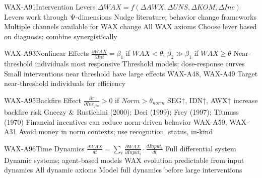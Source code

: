 \begin{axiomspec}{WAX-A91}{Intervention Levers}
 $\Delta WAX = f(\Delta AWX, \Delta UNS, \Delta KOM, \Delta Inc)$
 Levers work through Ψ-dimensions
 Nudge literature; behavior change frameworks
 Multiple channels available for WAX change
 All WAX axioms
 Choose lever based on diagnosis; combine synergistically
\end{axiomspec}

\begin{axiomspec}{WAX-A93}{Nonlinear Effects}
 $\frac{\partial WAX}{\partial Int} = \beta_1$ if $WAX < \theta$; $\beta_2 \gg \beta_1$ if $WAX \geq \theta$
 Near-threshold individuals most responsive
 Threshold models; dose-response curves
 Small interventions near threshold have large effects
 WAX-A48, WAX-A49
 Target near-threshold individuals for efficiency
\end{axiomspec}

\begin{axiomspec}{WAX-A95}{Backfire Effect}
 $\frac{\partial \tau}{\partial Inc_{fin}} > 0$ if $Norm > \theta_{norm}$
 SEG↑, IDN↑, AWX↑ increase backfire risk
 Gneezy \& Rustichini (2000); Deci (1999); Frey (1997); Titmuss (1970)
 Financial incentives can reduce norm-driven behavior
 WAX-A59, WAX-A31
 Avoid money in norm contexts; use recognition, status, in-kind
\end{axiomspec}


\begin{axiomspec}{WAX-A96}{Time Dynamics}
 $\frac{dWAX}{dt} = \sum_i \frac{\partial WAX}{\partial Input_i} \cdot \frac{dInput_i}{dt}$
 Full differential system
 Dynamic systems; agent-based models
 WAX evolution predictable from input dynamics
 All dynamic axioms
 Model full dynamics before large interventions
\end{axiomspec}

